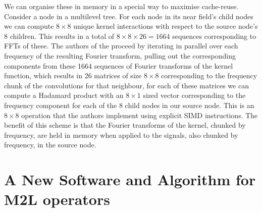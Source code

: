 \documentclass[12pt, a4, twoside]{article}
\begin{document}
We can organise these in memory in a special way to maximise cache-reuse. Consider a node in a multilevel tree. For each node in its near field's child nodes we can compute $8 \times 8$ unique kernel interactions with respect to the source node's 8 children. This results in a total of $8 \times 8 \times 26 = 1664$ sequences corresponding to FFTs of these. The authors of the \cite{Malhotra2015} proceed by iterating in parallel over each frequency of the resulting Fourier transform, pulling out the corresponding components from these 1664 sequences of Fourier transforms of the kernel function, which results in 26 matrices of size $8 \times 8$ corresponding to the frequency chunk of the convolutions for that neighbour, for each of these matrices we can compute a Hadamard product with an $8 \times 1$ sized vector corresponding to the frequency component for each of the 8 child nodes in our source node. This is an $8 \times 8$ operation that the authors implement using explicit SIMD instructions. The benefit of this scheme is that the Fourier transforms of the kernel, chunked by frequency, are held in memory when applied to the signals, also chunked by frequency, in the source node.


                


\section{A New Software and Algorithm for M2L operators}
\end{document}
